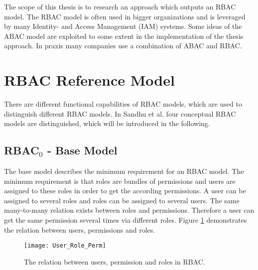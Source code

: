     The scope of this thesis is to research an approach which outputs an RBAC model. The RBAC model is often used in bigger organizations\cite{o20102010} and is leveraged by many Identity- and Access Management (IAM) systems. Some ideas of the ABAC model are exploited to some extent in the implementation of the thesis approach. In praxis many companies use a combination of ABAC and RBAC.
    
    \section{RBAC Reference Model}
    \label{sec:rbacmodels}
    There are different functional capabilities of RBAC models, which are used to distinguish different RBAC models. In Sandhu et al.\cite{Sandhu:1996} four conceptual RBAC models are distinguished, which will be introduced in the following.
        \subsection{RBAC$_0$ - Base Model}
            The base model describes the minimum requirement for an RBAC model. The minimum requirement is that roles are bundles of permissions and users are assigned to these roles in order to get the according permissions. A user can be assigned to several roles and roles can be assigned to several users. The same many-to-many relation exists between roles and permissions. Therefore a user can get the same permission several times via different roles. Figure \ref{fig:basicRBAC} demonstrates the relation between users, permissions and roles.\iffalse Furthermore sessions are also considered in the base model in Sandhu et al.\cite{Sandhu:1996}. A session is a mapping of one user to many roles. With a session a user can activate a subset of roles he or she is assigned to. \fi
            \begin{figure}[H]
                \centering
                \texttt{[image: User\_Role\_Perm]}
                \caption{The relation between users, permission and roles in RBAC.}
                \label{fig:basicRBAC}
            \end{figure}
            
